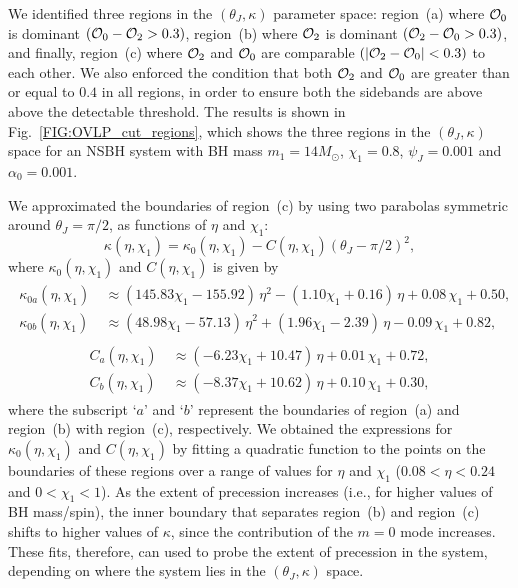 We identified three regions in the $(\theta_J, \kappa)$ parameter space:
region~(a) where ${\cal{O}}_0$ is dominant $({\cal{O}}_0 - {\cal{O}}_2 >
0.3)$, region~(b) where ${\cal{O}}_2$ is dominant $({\cal{O}}_2 - {\cal{O}}_0
> 0.3)$, and finally, region~(c) where ${\cal O}_2$ and ${\cal O}_0$ are
comparable $(|{\cal{O}}_2-{\cal{O}}_0|< 0.3)$ to each other. We also enforced
the condition that both ${\cal O}_2$ and ${\cal O}_0$ are greater than or
equal to $0.4$ in all regions, in order to ensure both the sidebands are above
above the detectable threshold. The results is shown in
Fig.~\ref{FIG:OVLP_cut_regions}, which shows the three regions in the
$(\theta_J,\kappa)$ space for an NSBH system with BH mass $m_{1}=14 M_\odot$,
$\chi_1=0.8$, $\psi_J=0.001$ and $\alpha_0 =0.001$.


We approximated the boundaries of region~(c) by using two parabolas symmetric
around $\theta_J=\pi/2$, as functions of $\eta$ and $\chi_1$:
\begin{equation}
\kappa(\eta, \chi_1) = \kappa_{0}(\eta, \chi_1) - C(\eta, \chi_1)(\theta_J-\pi/2)^2, 
\label{EQ:boundary_region}
\end{equation}
where $\kappa_{0}(\eta, \chi_1)$ and $C(\eta, \chi_1)$ is given by
\begin{align}
\begin{split}
\kappa_{0a}(\eta, \chi_{1})~&\approx  (145.83 \chi_{1} - 155.92)\, \eta^2 -
(1.10 \chi_{1} + 0.16)\, \eta+ 0.08 \, \chi_{1}+0.50,\\
\kappa_{0b}(\eta, \chi_{1})~&\approx (48.98\chi_{1} - 57.13) \,\eta^2 +
(1.96{\chi_{1}}-2.39)\, \eta - 0.09 \, \chi_{1} +0.82,
\label{EQ:kappa_boundary}
\end{split}
\end{align}
\vspace{-10mm}
\begin{align}
\begin{split}
C_{a}(\eta, \chi_{1})~&\approx  (-6.23{\chi_{1}} + 10.47)\,
\eta +  0.01\, \chi_{1}+ 0.72,\\
C_{b}(\eta, \chi_{1})~&\approx  (-8.37{\chi_{1}} + 10.62)\, \eta +  0.10\,
\chi_{1}+ 0.30,
\label{EQ:phi_boundary}
\end{split}
\end{align}
where the subscript `$a$' and `$b$' represent the boundaries of region~(a) and
region~(b) with region~(c), respectively. We obtained the expressions for
$\kappa_{0}(\eta, \chi_1)$ and $C(\eta, \chi_1)$ by fitting a quadratic
function to the points on the boundaries of these regions over a range of
values for $\eta$ and $\chi_1$ ($0.08 < \eta < 0.24$ and $0 < \chi_1 < 1$).
As the extent of precession increases (i.e., for higher values of BH
mass/spin), the inner boundary that separates region~(b) and region~(c) shifts
to higher values of $\kappa$, since the contribution of the $m=0$ mode
increases. These fits, therefore, can used to probe the extent of precession
in the system, depending on where the system lies in the $(\theta_J,
\kappa)$ space.

